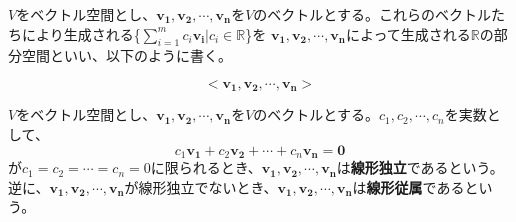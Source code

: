 \documentclass{jlreq}
\begin{document}
\begin{definitionbox}[線型結合の張る空間]
  $V$をベクトル空間とし、$\boldsymbol{v_1}, \boldsymbol{v_2}, \cdots, \boldsymbol{v_n}$を$V$のベクトルとする。これらのベクトルたちにより生成される\{$\sum_{i=1}^m c_i \boldsymbol{v_i} | c_i \in \mathbb{R}$\}を
  $\boldsymbol{v_1}, \boldsymbol{v_2}, \cdots, \boldsymbol{v_n}$によって生成される$\mathbb{R}$の部分空間といい、以下のように書く。

  \begin{equation*}
    <\boldsymbol{v_1}, \boldsymbol{v_2}, \cdots, \boldsymbol{v_n} >
  \end{equation*}
\end{definitionbox}

\begin{definitionbox}[線形独立と線形従属]
  $V$をベクトル空間とし、$\boldsymbol{v_1}, \boldsymbol{v_2}, \cdots, \boldsymbol{v_n}$を$V$のベクトルとする。$c_1, c_2, \cdots, c_n$を実数として、
  \begin{equation*}
    c_1 \boldsymbol{v_1} + c_2 \boldsymbol{v_2} + \cdots + c_n \boldsymbol{v_n} = \boldsymbol{0}
  \end{equation*}
  が$c_1 = c_2 = \cdots = c_n = 0$に限られるとき、$\boldsymbol{v_1}, \boldsymbol{v_2}, \cdots, \boldsymbol{v_n}$は\textbf{線形独立}であるという。 \\
  逆に、$\boldsymbol{v_1}, \boldsymbol{v_2}, \cdots, \boldsymbol{v_n}$が線形独立でないとき、$\boldsymbol{v_1}, \boldsymbol{v_2}, \cdots, \boldsymbol{v_n}$は\textbf{線形従属}であるという。
\end{definitionbox}
\end{document}
